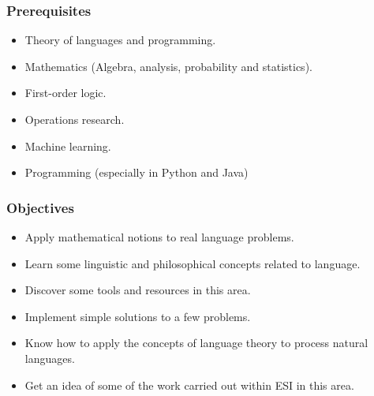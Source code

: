 \documentclass{beamer}
\subtitle[Presentation]{Course "Curse" presentation}
\begin{document}
 

\begin{frame}
\frametitle{Prerequisites}

\begin{itemize}
	\item Theory of languages and programming.
	\item Mathematics (Algebra, analysis, probability and statistics).
	\item First-order logic.
	\item Operations research.
	\item Machine learning.
	\item Programming (especially in Python and Java)
\end{itemize}

\end{frame}


\begin{frame}
\frametitle{Objectives}

\begin{itemize}
	\item Apply mathematical notions to real language problems.
	\item Learn some linguistic and philosophical concepts related to language.
	\item Discover some tools and resources in this area.
	\item Implement simple solutions to a few problems.
	\item Know how to apply the concepts of language theory to process natural languages.
	\item Get an idea of some of the work carried out within ESI in this area.
\end{itemize}

\end{frame}
\end{document}
